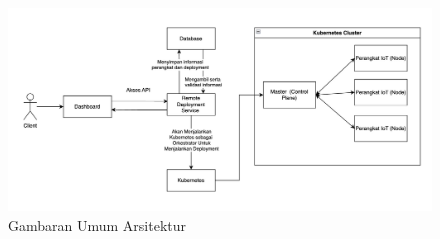 \begin{figure}[h]
  \centering
  \includegraphics[width=1\textwidth]{resources/chapter-3/gambaran-umum-arsitektur-updated.jpg}
  \caption{Gambaran Umum Arsitektur}
  \label{fig:gambaran-umum-arsitektur}
\end{figure}

\pagebreak






